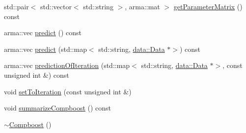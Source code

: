 \begin{DoxyCompactItemize}
std\+::pair$<$ std\+::vector$<$ std\+::string $>$, arma\+::mat $>$ \hyperlink{classcboost_1_1_compboost_a1652d7fa10039beaee1998e640f1b68a}{get\+Parameter\+Matrix} () const
\item 
arma\+::vec \hyperlink{classcboost_1_1_compboost_a32d1066a24607ff6ef2f934002adf62b}{predict} () const
\item 
arma\+::vec \hyperlink{classcboost_1_1_compboost_a1779a0c89cf9da32b250c0c083631c58}{predict} (std\+::map$<$ std\+::string, \hyperlink{classdata_1_1_data}{data\+::\+Data} $\ast$$>$) const
\item 
arma\+::vec \hyperlink{classcboost_1_1_compboost_a6582a12bf1060750367219aeae395963}{prediction\+Of\+Iteration} (std\+::map$<$ std\+::string, \hyperlink{classdata_1_1_data}{data\+::\+Data} $\ast$$>$, const unsigned int \&) const
\item 
void \hyperlink{classcboost_1_1_compboost_ad1ee3b88f585f38255d827dceb4b7659}{set\+To\+Iteration} (const unsigned int \&)
\item 
void \hyperlink{classcboost_1_1_compboost_a7be8cb767054ece895d535c1f468233e}{summarize\+Compboost} () const
\item 
\hyperlink{classcboost_1_1_compboost_a3e23314cc3a1d31fc5df61e0a16c51e4}{$\sim$\+Compboost} ()
\end{DoxyCompactItemize}
